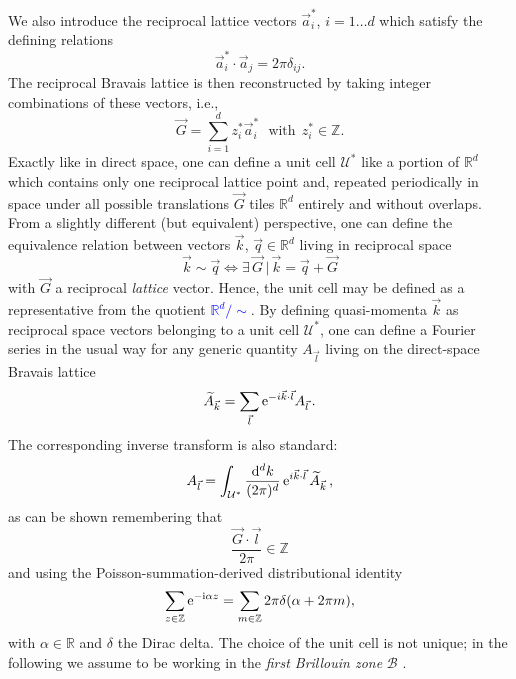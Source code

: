 \documentclass[prl,aps,twocolumn,showpacs,superscriptaddress,longbibliography]{revtex4-1}
\newcommand{\be}{\begin{equation}}
\newcommand{\ee}{\end{equation}}
\newcommand{\mal}{\mathcal}
\newcommand{\rmd}{{\rm{d}}}
\newcommand{\rmi}{{\rm{i}}}
\newcommand{\rme}[1]{{\rm{e}}^{#1}}
\newcommand{\wt}{\widetilde}
\newcommand{\R}{\mathbb{R}}
\newcommand{\Z}{\mathbb{Z}}
\newcommand{\change}[1]{\textcolor{blue}{#1}}
\begin{document}
We also introduce the reciprocal lattice vectors $\vec{a}_i^\ast$, $i = 1 \ldots d$ which satisfy the defining relations
\be
	\vec{a}_i^\ast \cdot \vec{a}_j = 2\pi \delta_{ij}.
\ee
The reciprocal Bravais lattice is then reconstructed by taking integer combinations of these vectors, i.e.,
\be
	\vec{G} = \sum_{i=1}^d z_i^\ast \vec{a}_i^\ast \ \ \ \text{with} \ \ z_i^\ast \in \mathbb Z.
	\label{eq:rec}
\ee
Exactly like in direct space, one can define a unit cell $\mal{U}^\ast$ like a portion of $\R^d$ which contains only one reciprocal lattice point and, repeated periodically in space under all possible translations $\vec{G}$ tiles $\R^d$ entirely and without overlaps. From a slightly different (but equivalent) perspective, one can define the equivalence relation between vectors $\vec{k}$, $\vec{q} \in \R^d$ living in reciprocal space
\be 
	\vec{k} \sim \vec{q} \Leftrightarrow \exists\, \vec{G} \,|\, \vec{k} = \vec{q} + \vec{G}
\ee
with $\vec{G}$ a reciprocal \emph{lattice} vector. Hence, the unit cell may be defined as a representative from the quotient \change{$\R^d / \sim$}. By defining quasi-momenta $\vec{k}$ as reciprocal space vectors belonging to a unit cell $\mal{U}^\ast$, one can define a Fourier series in the usual way for any generic quantity $A_{\vec{l}}$ living on the direct-space Bravais lattice  
\be
	\wt{A}_{\vec{k}} =  \sum_{\vec{l}} \rme{-i \vec{k} \cdot \vec{l}} A_{\vec{l}} \,.
\ee
The corresponding inverse transform is also standard:
\be
	A_{\vec{l}} = \int_{\mal{U}^\ast} \frac{\rmd^d k}{(2\pi)^d} \,\rme{i \vec{k} \cdot \vec{l}}\, \wt{A}_{\vec{k}} \,,
\ee
as can be shown remembering that
\be
	\frac{\vec{G} \cdot \vec{l}}{2\pi} \in \Z
\ee
and using the Poisson-summation-derived distributional identity
\be
	\sum_{z\in \Z} \rme{-\rmi \alpha z} = \sum_{m \in \Z} 2 \pi \delta (\alpha + 2\pi m),
\ee
with $\alpha \in \R$ and $\delta$ the Dirac delta. The choice of the unit cell is not unique; in the following we assume to be working in the \emph{first Brillouin zone} $\mal{B}$ \cite{Grosso}.
\end{document}
